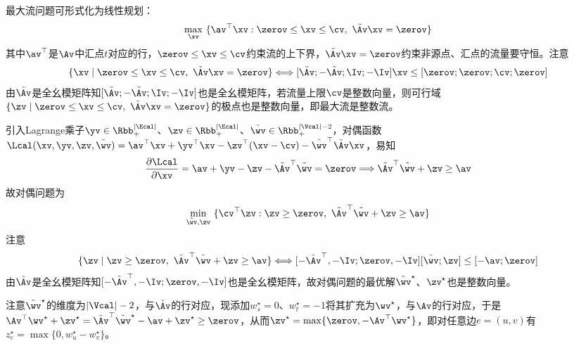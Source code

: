 \documentclass{ctexart}
\begin{document}
最大流问题可形式化为线性规划：
\begin{align*}
    \max_{\xv} ~ \{ \av^\top \xv : \zerov \le \xv \le \cv, ~ \tilde{\Av} \xv = \zerov \}
\end{align*}
其中$\av^\top$是$\Av$中汇点$t$对应的行，$\zerov \le \xv \le \cv$约束流的上下界，$\tilde{\Av} \xv = \zerov$约束非源点、汇点的流量要守恒。注意
\begin{align*}
    \{ \xv \mid \zerov \le \xv \le \cv, ~ \tilde{\Av} \xv = \zerov \} \Longleftrightarrow [\tilde{\Av}; -\tilde{\Av}; \Iv; -\Iv] \xv \leq [\zerov; \zerov; \cv; \zerov]
\end{align*}
由$\tilde{\Av}$是全幺模矩阵知$[\tilde{\Av}; -\tilde{\Av}; \Iv; -\Iv]$也是全幺模矩阵，若流量上限$\cv$是整数向量，则可行域$\{ \zv \mid \zerov \le \xv \le \cv, ~ \tilde{\Av} \xv = \zerov \}$的极点也是整数向量，即最大流是整数流。

引入Lagrange乘子$\yv \in \Rbb_+^{|\Ecal|}$、$\zv \in \Rbb_+^{|\Ecal|}$、$\tilde{\wv} \in \Rbb_+^{|\Vcal|-2}$，对偶函数$\Lcal(\xv, \yv, \zv, \tilde{\wv}) = \av^\top \xv + \yv^\top \xv - \zv^\top (\xv - \cv) - \tilde{\wv}^\top \tilde{\Av} \xv$，易知
\begin{align*}
    \frac{\partial \Lcal}{\partial \xv} = \av + \yv - \zv - \tilde{\Av}^\top \tilde{\wv} = \zerov \Longrightarrow \tilde{\Av}^\top \tilde{\wv} + \zv \ge \av
\end{align*}
故对偶问题为
\begin{align*}
    \min_{\tilde{\wv}, \zv} ~ \{ \cv^\top \zv : \zv \ge \zerov, ~ \tilde{\Av}^\top \tilde{\wv} + \zv \ge \av \}
\end{align*}
注意
\begin{align*}
    \{ \zv \mid \zv \ge \zerov, ~ \tilde{\Av}^\top \tilde{\wv} + \zv \ge \av \} \Longleftrightarrow [-\tilde{\Av}^\top, -\Iv; \zerov, -\Iv] [\tilde{\wv}; \zv] \leq [-\av; \zerov]
\end{align*}
由$\tilde{\Av}$是全幺模矩阵知$[-\tilde{\Av}^\top, -\Iv; \zerov, -\Iv]$也是全幺模矩阵，故对偶问题的最优解$\tilde{\wv}^\star$、$\zv^\star$也是整数向量。

注意$\tilde{\wv}^\star$的维度为$|\Vcal| - 2$，与$\tilde{\Av}$的行对应，现添加$w_s^\star = 0$、$w_t^\star = -1$将其扩充为$\wv^\star$，与$\Av$的行对应，于是$\Av^\top \wv^\star + \zv^\star = \tilde{\Av}^\top \tilde{\wv}^\star - \av + \zv^\star \ge \zerov$，从而$\zv^\star = \max \{ \zerov, - \Av^\top \wv^\star \}$，即对任意边$e = (u,v)$有$z^\star_e = \max \{ 0, w_u^\star - w_v^\star \}$。
\end{document}
